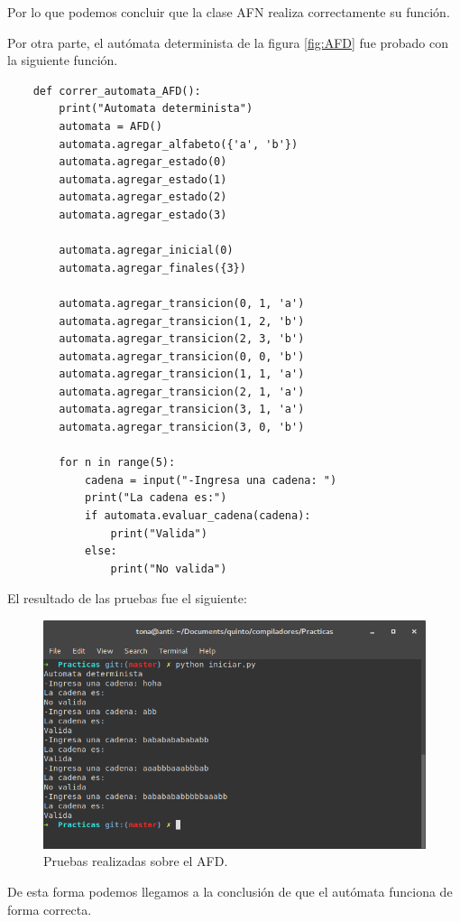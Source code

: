 \documentclass[titlepage]{article}
\begin{document}
	Por lo que podemos concluir que la clase AFN realiza correctamente su función.
	
	Por otra parte, el autómata determinista de la figura \ref{fig:AFD} fue probado con la siguiente función.
	
	\begin{lstlisting}
	def correr_automata_AFD():
		print("Automata determinista")
		automata = AFD()
		automata.agregar_alfabeto({'a', 'b'})
		automata.agregar_estado(0)
		automata.agregar_estado(1)
		automata.agregar_estado(2)
		automata.agregar_estado(3)
		
		automata.agregar_inicial(0)
		automata.agregar_finales({3})
		
		automata.agregar_transicion(0, 1, 'a')
		automata.agregar_transicion(1, 2, 'b')
		automata.agregar_transicion(2, 3, 'b')
		automata.agregar_transicion(0, 0, 'b')
		automata.agregar_transicion(1, 1, 'a')
		automata.agregar_transicion(2, 1, 'a')
		automata.agregar_transicion(3, 1, 'a')
		automata.agregar_transicion(3, 0, 'b')
		
		for n in range(5):
			cadena = input("-Ingresa una cadena: ")
			print("La cadena es:")
			if automata.evaluar_cadena(cadena):
				print("Valida")
			else:
				print("No valida")
	\end{lstlisting}
	
	El resultado de las pruebas fue el siguiente:
	
	\begin{figure}[H]
		\begin{center}
			\includegraphics[width=14cm]{AFDprueba.png}
			\caption{Pruebas realizadas sobre el AFD.}
			\label{fig:AFD2}
		\end{center}
	\end{figure}

	De esta forma podemos llegamos a la conclusión de que el autómata funciona de forma correcta.
	
\end{document}
